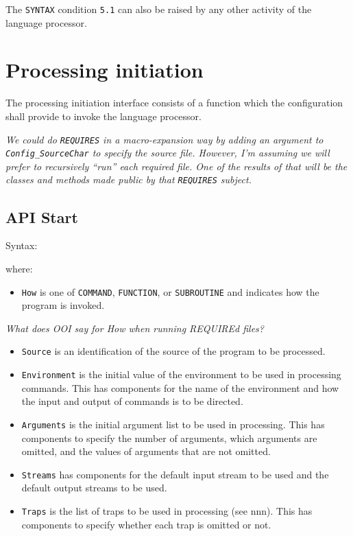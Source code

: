 The \texttt{\textquotesingle{}SYNTAX\textquotesingle{}} condition
\texttt{5.1} can also be raised by any other activity of the language
processor.

\section{Processing initiation}\label{processing-initiation}

The processing initiation interface consists of a function which the
configuration shall provide to invoke the language processor.

\emph{We could do \texttt{REQUIRES} in a macro-expansion way by adding
an argument to \texttt{Config\_SourceChar} to specify the source file.
However, I'm assuming we will prefer to recursively ``run'' each
required file. One of the results of that will be the classes and
methods made public by that \texttt{REQUIRES} subject.}

\subsection{API Start}\label{api-start}

Syntax:



where:

\begin{itemize}
\tightlist
\item
  \texttt{How} is one of
  \texttt{\textquotesingle{}COMMAND\textquotesingle{}},
  \texttt{\textquotesingle{}FUNCTION\textquotesingle{}}, or
  \texttt{\textquotesingle{}SUBROUTINE\textquotesingle{}} and indicates
  how the program is invoked.
\end{itemize}

\emph{What does OOI say for How when running REQUIREd files?}

\begin{itemize}
\item
  \texttt{Source} is an identification of the source of the program to
  be processed.
\item
  \texttt{Environment} is the initial value of the environment to be
  used in processing commands. This has components for the name of the
  environment and how the input and output of commands is to be
  directed.
\item
  \texttt{Arguments} is the initial argument list to be used in
  processing. This has components to specify the number of arguments,
  which arguments are omitted, and the values of arguments that are not
  omitted.
\item
  \texttt{Streams} has components for the default input stream to be
  used and the default output streams to be used.
\item
  \texttt{Traps} is the list of traps to be used in processing (see
  nnn). This has components to specify whether each trap is omitted or
  not.
\end{itemize}

